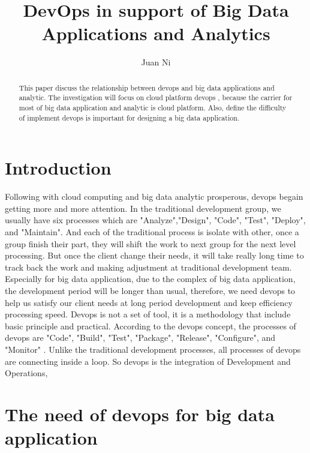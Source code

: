 \documentclass[sigconf]{acmart}
\begin{document}
\title{DevOps in support of Big Data Applications and Analytics}


\author{Juan Ni}




\begin{abstract}
This paper discuss the relationship between devops and big data applications and analytic. The investigation will focus on cloud platform devops , because the carrier for  most of big data application and analytic is cloud platform. Also, define the difficulty of implement devops is important for designing a big data application.
\end{abstract}



\maketitle

\section{Introduction}

Following with cloud computing and big data analytic prosperous, devops begain getting more and more attention. In the traditional development group, we usually have six processes which are "Analyze","Design", "Code", "Test", "Deploy", and "Maintain". And each of the traditional process is isolate with other, once a group finish their part, they will shift the work to next group for the next level processing. But once the client change their needs, it will take really long time to track back the work and making adjustment at traditional development team. Especially for big data application, due to the complex of big data application, the development period will be longer than usual, therefore, we need devops to help us satisfy our client needs at long period development and keep efficiency processing speed. Devops is not a set of tool, it is a methodology that include basic principle and practical. According to the devops concept, the processes of devops are "Code", "Build", "Test", "Package", "Release", "Configure", and "Monitor" \cite{wiki:01}. Unlike the traditional development processes, all processes of devops are connecting inside a loop. So devops is the integration of Development and Operations, 
 
\section{The need of devops for big data application}
\end{document}
